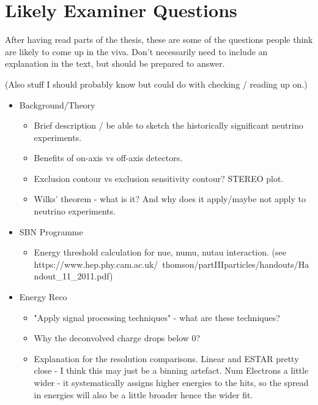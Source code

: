 \chapter{Likely Examiner Questions}\label{Likely Examiner Questions}

After having read parts of the thesis, these are some of the questions people think are likely to come up in the viva. Don't necessarily need to include an explanation in the text, but should be prepared to answer.

(Also stuff I should probably know but could do with checking / reading up on.)

\begin{itemize}
    \item Background/Theory
    \begin{itemize}
        \item Brief description / be able to sketch the historically significant neutrino experiments.
        \item Benefits of on-axis vs off-axis detectors. 
        \item Exclusion contour vs exclusion sensitivity contour? STEREO plot.
        \item Wilks' theorem - what is it? And why does it apply/maybe not apply to neutrino experiments.
    \end{itemize}
    
    \item SBN Programme
    \begin{itemize}
        \item Energy threshold calculation for nue, numu, nutau interaction. (see https://www.hep.phy.cam.ac.uk/~thomson/partIIIparticles/handouts/Handout\_11\_2011.pdf)
    \end{itemize}
    
    \item Energy Reco
    \begin{itemize}
        \item "Apply signal processing techniques" - what are these techniques?
        \item Why the deconvolved charge drops below 0?
        \item Explanation for the resolution comparisons. Linear and ESTAR pretty close - I think this may just be a binning artefact. Num Electrons a little wider - it systematically assigns higher energies to the hits, so the spread in energies will also be a little broader hence the wider fit. 
    \end{itemize}
    

\end{itemize}
